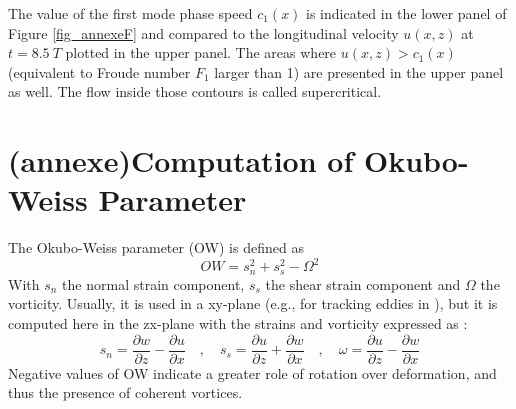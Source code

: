  The value of the first mode phase speed $c_1(x)$  is indicated in the lower panel of Figure \ref{fig_annexeF} and compared to the longitudinal velocity $u(x,z)$ at $t = 8.5\ T$ plotted in the upper panel. The areas where $u(x,z) > c_1 (x)$ (equivalent to Froude number $F_1$ larger than 1) are presented in the upper panel as well. The flow inside those contours is called supercritical.
 
 \section{(annexe)Computation of Okubo-Weiss Parameter}
 \label{annexeOW}
The Okubo-Weiss parameter (OW) is defined as
\begin{equation}
OW=s_n^2+s_s^2-\Omega^2
\label{eqOW}
\end{equation}
With $s_n$ the normal strain component, $s_s$ the shear strain component and $\Omega$ the vorticity. Usually, it is used in a xy-plane (e.g., for tracking eddies in \citet{Chelton2007}), but it is computed here in the zx-plane with the strains and vorticity expressed as :
\begin{equation}
s_n = \frac{\partial w}{\partial z} - \frac{\partial u}{\partial x} \quad , \quad
s_s = \frac{\partial u}{\partial z} + \frac{\partial w}{\partial x} \quad , \quad
\omega = \frac{\partial u}{\partial z} - \frac{\partial w}{\partial x}
\end{equation}
Negative values of OW indicate a greater role of rotation over deformation, and thus the presence of coherent vortices.

